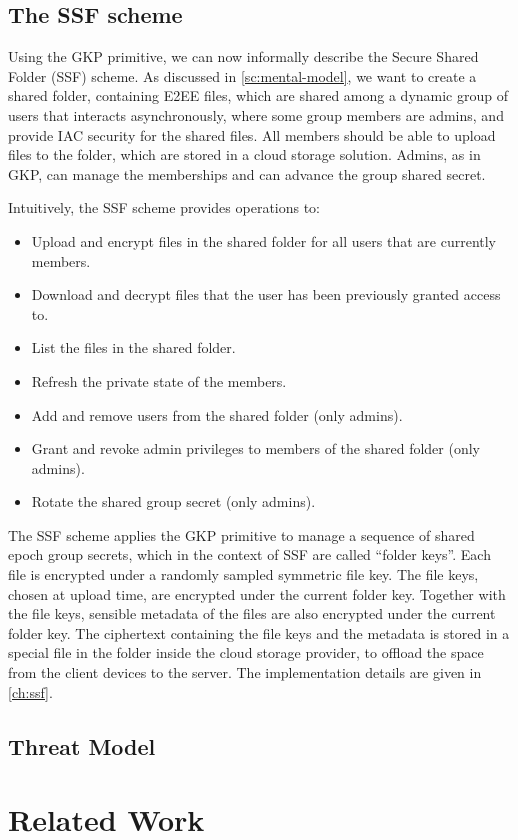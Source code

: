 \subsection{The SSF scheme}\label{sc:SSF-scheme}

Using the GKP primitive, we can now informally describe the Secure Shared Folder (SSF) scheme.
As discussed in \cref{sc:mental-model}, we want to create 
a shared folder, containing E2EE files, which are shared
among a dynamic group of users that interacts asynchronously, where
some group members are admins, and provide IAC security for the shared files. 
All members should be able to
upload files to the folder, which are stored
in a cloud storage solution. 
Admins, as in GKP, can manage the
memberships and can advance the group shared secret.

Intuitively, the SSF scheme provides operations to:
\begin{itemize}
    \item Upload and encrypt files in the shared folder for all users that
    are currently members.
    \item Download and decrypt files that the user has been previously granted access to. 
    \item List the files in the shared folder.
    \item Refresh the private state of the members.
    \item Add and remove users from the shared folder (only admins).
    \item Grant and revoke admin privileges to members of the shared folder (only admins).
    \item Rotate the shared group secret (only admins).
\end{itemize}

The SSF scheme applies the GKP primitive to manage a sequence
of shared epoch group secrets, which in the context of SSF are called
``folder keys''. 
Each file is encrypted under a randomly sampled symmetric file key.
The file keys, chosen at upload time, are encrypted under the current
folder key. Together with the file keys, sensible metadata of the files
are also encrypted under the current folder key.
The ciphertext containing the file keys and the metadata is stored
in a special file in the folder inside the cloud storage provider,
to offload the space from the client devices to the server.
The implementation details are given in \cref{ch:ssf}.

\subsection{Threat Model}

\section{Related Work}\label{sc:related-work}





